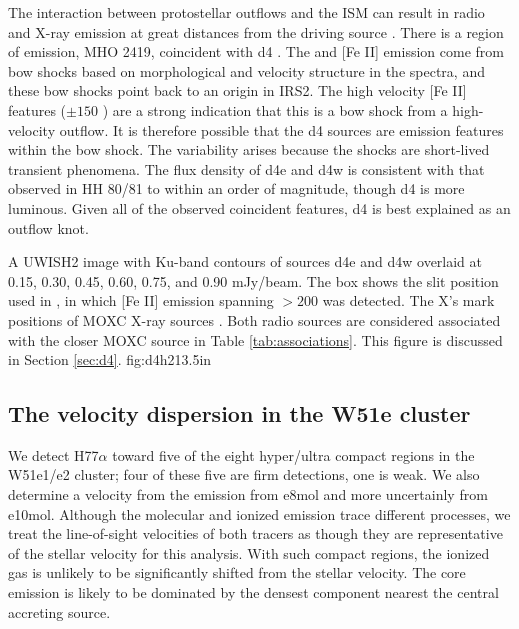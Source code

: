 The interaction between protostellar outflows and the ISM can result in radio
and X-ray emission at great distances from the driving source \citep[e.g.,
HH80/81][]{Lopez-Santiago2013a,Masque2015a}.  There is a region of \hh emission,
MHO 2419, coincident with d4 \citep[Figure
\ref{fig:d4h2}][]{Hodapp2002a,Froebrich2011a}.  The \hh and [Fe II] emission
come from bow shocks based on morphological and velocity structure in the
\citet{Hodapp2002a} spectra, and these bow shocks point back to an origin in
IRS2.  The high velocity [Fe II] features ($\pm150$ \kms) are a strong
indication that this is a bow shock from a high-velocity outflow.  It is
therefore possible that the d4 sources are emission features within the bow
shock.  The variability arises because the shocks are short-lived transient
phenomena.  The flux density of d4e and d4w is consistent with that observed
in HH 80/81 \citep{Masque2015a} to within an order of magnitude, though d4
is more luminous.  Given all of the observed coincident features, d4 is best
explained as an outflow knot.  

{A UWISH2 \hh image with Ku-band contours of sources d4e and d4w overlaid at
0.15, 0.30, 0.45, 0.60, 0.75, and 0.90 mJy/beam.  The box shows the slit
position used in \citet{Hodapp2002a}, in which [Fe II] emission spanning
$>200$ \kms was detected.  The X's mark positions of MOXC X-ray
sources \citep{Townsley2014a}.  Both radio sources are considered
associated with the closer MOXC source in Table \ref{tab:associations}.
This figure is discussed in Section \ref{sec:d4}.
}
{fig:d4h2}{1}{3.5in}

\subsection{The velocity dispersion in the W51e cluster}
\label{sec:vdisp}
We detect H77$\alpha$ toward five of the eight hyper/ultra compact \hii regions
in the W51e1/e2 cluster; four of these five are firm detections, one
is weak.  We also determine a velocity from the \formaldehyde emission from
e8mol and more uncertainly from e10mol.  Although the molecular and ionized
emission trace different processes, we treat the line-of-sight velocities of
both tracers as though they are representative of the stellar velocity for this
analysis.  With such compact \hii regions, the ionized gas is unlikely to be
significantly shifted from the stellar velocity.  The core emission is likely
to be dominated by the densest component nearest the central accreting source.

